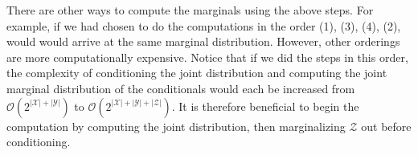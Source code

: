 \begin{remark}
There are other ways to compute the marginals using the above steps. For example, if we had chosen to do the computations in the order (1), (3), (4), (2), would would arrive at the same marginal distribution. However, other orderings are more computationally expensive. Notice that if we did the steps in this order, the complexity of conditioning the joint distribution and computing the joint marginal distribution of the conditionals would each be increased from $\mathcal{O}(2^{|\mathcal{X}|+|\mathcal{Y}|})$ to $\mathcal{O}(2^{|\mathcal{X}|+|\mathcal{Y}|+|\mathcal{Z}|})$. It is therefore beneficial to begin the computation by computing the joint distribution, then marginalizing $\mathcal{Z}$ out before conditioning. 
\end{remark}


